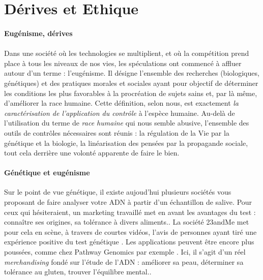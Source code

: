 \section{Dérives et Ethique}

\paragraph{Eugénisme, dérives}

\paragraph{} Dans une société où les technologies se multiplient, et où la compétition prend place
à tous les niveaux de nos vies, les spéculations ont commencé à affluer autour d'un terme : l'eugénisme.
Il désigne l'ensemble des recherches (biologiques, génétiques) et des pratiques morales et sociales
ayant pour objectif de \guillemotleft déterminer les conditions les plus favorables à la procréation
de sujets sains et, par là même, d'améliorer la race humaine\guillemotright  \cite{Eugenisme0}. Cette
définition, selon nous, est exactement \emph{la caractérisation de l'application du contrôle} à l'espèce
humaine. Au-delà de l'utilisation du terme de \emph{race humaine} qui nous semble abusive, l'ensemble des
outils de contrôles nécessaires sont réunis : la régulation de la Vie par la génétique et la biologie, la
linéarisation des pensées par la propagande sociale, tout cela derrière une volonté apparente de faire le bien.

\paragraph{Génétique et eugénisme} Sur le point de vue génétique, il existe aujoud'hui plusieurs sociétés
vous proposant de faire analyser votre ADN à partir d'un échantillon de salive. Pour ceux qui hésiteraient,
un marketing travaillé met en avant les avantages du test : connaître ses origines, sa tolérance à divers
aliments.. La société 23andMe met pour cela en scène, à travers de courtes vidéos, l'avis de personnes
ayant tiré une expérience positive du test génétique \cite{23andMe}. Les applications peuvent être 
encore plus poussées, comme chez Pathway Genomics par exemple \cite{Pathway0}. Ici, il s'agit d'un réel
\emph{merchandising} fondé sur l'étude de l'ADN : améliorer sa peau, déterminer sa tolérance au gluten, 
trouver l'équilibre mental..

